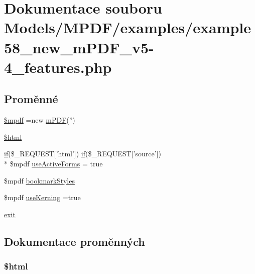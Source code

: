 \hypertarget{example58__new__m_p_d_f__v5-4__features_8php}{\section{Dokumentace souboru Models/\-M\-P\-D\-F/examples/example58\-\_\-new\-\_\-m\-P\-D\-F\-\_\-v5-\/4\-\_\-features.php}
\label{example58__new__m_p_d_f__v5-4__features_8php}
}
\subsection*{Proměnné}
\begin{DoxyCompactItemize}
\item 
\hyperlink{example58__new__m_p_d_f__v5-4__features_8php_ad028f81910d6cbab9b184d2214b3a8f8}{\$mpdf} =new \hyperlink{classm_p_d_f}{m\-P\-D\-F}('')
\item 
\hyperlink{example58__new__m_p_d_f__v5-4__features_8php_a6f96e7fc92441776c9d1cd3386663b40}{\$html}
\item 
\hyperlink{pdf__parser_8php_af8105e84b42a9ceda5357caeb6c4760b}{if}(\$\-\_\-\-R\-E\-Q\-U\-E\-S\-T\mbox{[}'html'\mbox{]}) \hyperlink{pdf__parser_8php_af8105e84b42a9ceda5357caeb6c4760b}{if}(\$\-\_\-\-R\-E\-Q\-U\-E\-S\-T\mbox{[}'source'\mbox{]}) \\*
\$mpdf \hyperlink{example58__new__m_p_d_f__v5-4__features_8php_a378161bd0fa26b3dc46a75ac7aa2671b}{use\-Active\-Forms} = true
\item 
\$mpdf \hyperlink{example58__new__m_p_d_f__v5-4__features_8php_aba1207356788956789ec9373eed734f4}{bookmark\-Styles}
\item 
\$mpdf \hyperlink{example58__new__m_p_d_f__v5-4__features_8php_aee7b0f8606c1b4849e0166a4a335069d}{use\-Kerning} =true
\item 
\hyperlink{example58__new__m_p_d_f__v5-4__features_8php_a6733eb5f605d09eaede9845835d71c4e}{exit}
\end{DoxyCompactItemize}


\subsection{Dokumentace proměnných}
\hypertarget{example58__new__m_p_d_f__v5-4__features_8php_a6f96e7fc92441776c9d1cd3386663b40}{
\subsubsection[{\$html}]{\setlength{\rightskip}{0pt plus 5cm}\$html}}\label{example58__new__m_p_d_f__v5-4__features_8php_a6f96e7fc92441776c9d1cd3386663b40}



